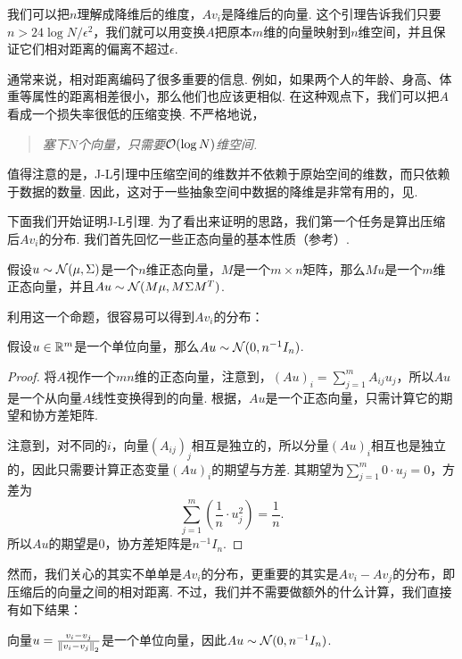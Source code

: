 我们可以把$n$理解成降维后的维度，$Av_i$是降维后的向量. 这个引理告诉我们只要$n > 24\log N/\epsilon^2$，我们就可以用变换$A$把原本$m$维的向量映射到$n$维空间，并且保证它们相对距离的偏离不超过$\epsilon$.

通常来说，相对距离编码了很多重要的信息. 例如，如果两个人的年龄、身高、体重等属性的距离相差很小，那么他们也应该更相似. 在这种观点下，我们可以把$A$看成一个损失率很低的压缩变换. 不严格地说，
\begin{quotation}
    \textit{塞下$N$个向量，只需要$\mathcal{O}(\log N)$维空间.}
\end{quotation}

值得注意的是，J-L引理中压缩空间的维数并不依赖于原始空间的维数，而只依赖于数据的数量. 因此，这对于一些抽象空间中数据的降维是非常有用的，见.

下面我们开始证明J-L引理. 为了看出来证明的思路，我们第一个任务是算出压缩后$Av_i$的分布. 我们首先回忆一些正态向量的基本性质（参考）. 

\begin{proposition}\label{prop:gaussian-vector}
假设$u\sim\mathcal{N}(\mu,\Sigma)$是一个$n$维正态向量，$M$是一个$m\times n$矩阵，那么$Mu$是一个$m$维正态向量，并且$Au\sim \mathcal{N}(M\mu,M\Sigma M^T)$.
\end{proposition}

利用这一个命题，很容易可以得到$Av_i$的分布：

\begin{lemma}\label{lemma:gaussian-vector}
    假设$u\in\mathbb{R}^m$是一个单位向量，那么$Au\sim \mathcal{N}(0,n^{-1}I_n)$.
\end{lemma}
\begin{proof}
    将$A$视作一个$mn$维的正态向量，注意到，$(Au)_i = \sum_{j=1}^m A_{ij}u_j$，所以$Au$是一个从向量$A$线性变换得到的向量. 根据，$Au$是一个正态向量，只需计算它的期望和协方差矩阵. 
   
   注意到，对不同的$i$，向量$(A_{ij})_{j}$相互是独立的，所以分量$(Au)_i$相互也是独立的，因此只需要计算正态变量$(Au)_i$的期望与方差. 其期望为$\sum_{j=1}^m 0\cdot u_j = 0$，方差为
   \[\sum_{j=1}^m \left(\frac{1}{n}\cdot u_j^2\right) = \frac{1}{n}.\] 
   所以$Au$的期望是$0$，协方差矩阵是$n^{-1}I_n$.
\end{proof}

然而，我们关心的其实不单单是$Av_i$的分布，更重要的其实是$Av_i-Av_j$的分布，即压缩后的向量之间的相对距离. 不过，我们并不需要做额外的什么计算，我们直接有如下结果：

\begin{lemma}\label{lemma:gaussian-vector-diff}
    向量$u=\frac{v_i-v_j}{\left\|v_i-v_j\right\|_2}$是一个单位向量，因此$Au\sim \mathcal{N}(0,n^{-1}I_n)$.
\end{lemma}

